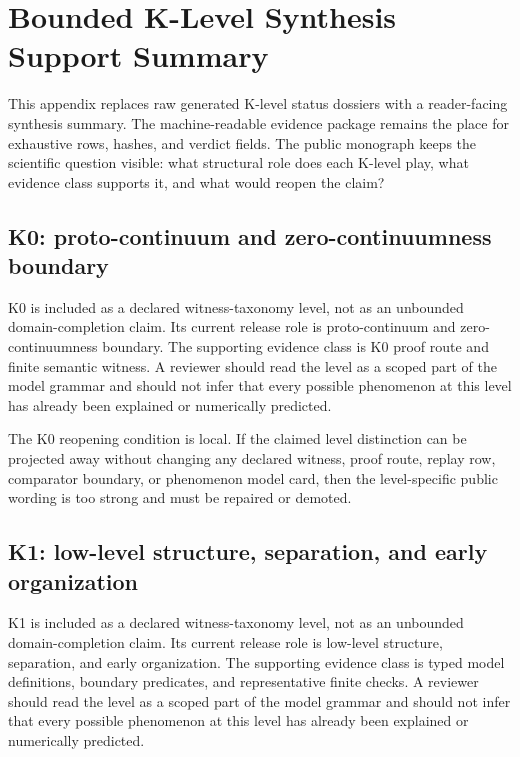 \section{Bounded K-Level Synthesis Support Summary}

\label{sec:oc133-bounded-klevel-synthesis-support-summary}

This appendix replaces raw generated K-level status dossiers with a reader-facing synthesis summary. The machine-readable evidence package remains the place for exhaustive rows, hashes, and verdict fields. The public monograph keeps the scientific question visible: what structural role does each K-level play, what evidence class supports it, and what would reopen the claim?


\subsection{K0: proto-continuum and zero-continuumness boundary}

K0 is included as a declared witness-taxonomy level, not as an unbounded domain-completion claim. Its current release role is proto-continuum and zero-continuumness boundary. The supporting evidence class is K0 proof route and finite semantic witness. A reviewer should read the level as a scoped part of the model grammar and should not infer that every possible phenomenon at this level has already been explained or numerically predicted.


The K0 reopening condition is local. If the claimed level distinction can be projected away without changing any declared witness, proof route, replay row, comparator boundary, or phenomenon model card, then the level-specific public wording is too strong and must be repaired or demoted.


\subsection{K1: low-level structure, separation, and early organization}

K1 is included as a declared witness-taxonomy level, not as an unbounded domain-completion claim. Its current release role is low-level structure, separation, and early organization. The supporting evidence class is typed model definitions, boundary predicates, and representative finite checks. A reviewer should read the level as a scoped part of the model grammar and should not infer that every possible phenomenon at this level has already been explained or numerically predicted.


